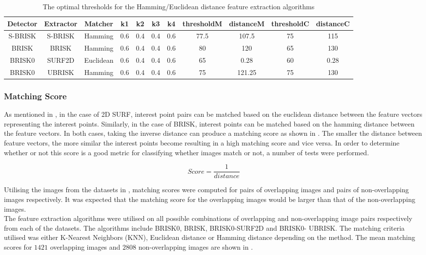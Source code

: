 \documentclass{article}
\begin{document}
\begin{table}
\caption{The optimal thresholds for the Hamming/Euclidean distance feature extraction algorithms}
\begin{tabular}{|c|c|c|c|c|c|c|c|c|c|c|}
\hline 
Detector & Extractor & Matcher & k1 & k2 & k3 & k4 & thresholdM & distanceM & thresholdC & distanceC\tabularnewline
\hline 
\hline 
S-BRISK & S-BRISK & Hamming & 0.6 & 0.4 & 0.4 & 0.6 & 77.5 & 107.5 & 75 & 115\tabularnewline
\hline 
BRISK & BRISK & Hamming & 0.6 & 0.4 & 0.4 & 0.6 & 80 & 120 & 65 & 130\tabularnewline
\hline 
BRISK0 & SURF2D & Euclidean & 0.6 & 0.4 & 0.4 & 0.6 & 65 & 0.28 & 60 & 0.28\tabularnewline
\hline 
BRISK0 & UBRISK & Hamming & 0.6 & 0.4 & 0.4 & 0.6 & 75 & 121.25 & 75 & 130\tabularnewline
\hline 
\end{tabular}
\label{tab:hammingStatistics}
\end{table}

\subsubsection{Matching Score}
\label{sec:matchingScore}
As mentioned in , in the case of 2D SURF, interest point pairs can be matched based on the euclidean distance between the feature vectors representing the interest points. Similarly, in the case of BRISK, interest points can be matched based on the hamming distance between the feature vectors. In both cases, taking the inverse distance can produce a matching score as shown in . The smaller the distance between feature vectors, the more similar the interest points become resulting in a high matching score and vice versa. In order to determine whether or not this score is a good metric for classifying whether images match or not, a number of tests were performed.

\begin{equation}
Score = \frac{1}{distance}
\label{eqn:inverseDistance}
\end{equation}

Utilising the images from the datasets in , matching scores were computed for pairs of overlapping images and pairs of non-overlapping images respectively. It was expected that the matching score for the overlapping images would be larger than that of the non-overlapping images. \\

The feature extraction algorithms were utilised on all possible combinations of overlapping and non-overlapping image pairs respectively from each of the datasets. The algorithms include BRISK0, BRISK, BRISK0-SURF2D and BRISK0- UBRISK. The matching criteria utilised was either K-Nearest Neighbors (KNN), Euclidean distance or Hamming distance depending on the method. The mean matching scores for $1421$ overlapping images and $2808$ non-overlapping images are shown in . \\
\end{document}
